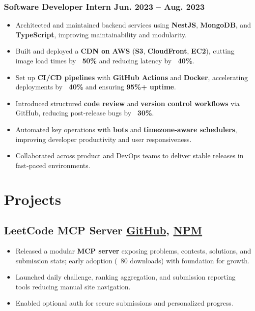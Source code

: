 \documentclass[letterpaper,11pt]{article}
\newcommand{\rside}[1]{
  \hfill {\small\color{accent} #1}%
}
\begin{document}
\subsubsection{Software Developer Intern \rside{Jun. 2023 -- Aug. 2023}}
\begin{itemize}
  \item Architected and maintained backend services using \textbf{NestJS}, \textbf{MongoDB}, and \textbf{TypeScript}, improving maintainability and modularity.
  \item Built and deployed a \textbf{CDN on AWS} (\textbf{S3}, \textbf{CloudFront}, \textbf{EC2}), cutting image load times by \textbf{~50\%} and reducing latency by \textbf{~40\%}.
  \item Set up \textbf{CI/CD pipelines} with \textbf{GitHub Actions} and \textbf{Docker}, accelerating deployments by \textbf{~40\%} and ensuring \textbf{95\%+ uptime}.
  \item Introduced structured \textbf{code review} and \textbf{version control workflows} via GitHub, reducing post-release bugs by \textbf{~30\%}.
  \item Automated key operations with \textbf{bots} and \textbf{timezone-aware schedulers}, improving developer productivity and user responsiveness.
  \item Collaborated across product and DevOps teams to deliver stable releases in fast-paced environments.
\end{itemize}

\section{Projects}

\subsection{LeetCode MCP Server \rside{\href{https://github.com/ayushjaipuriyar/leetcode-mcpserver}{GitHub}, \href{https://www.npmjs.com/package/leetcode-mcpserver}{NPM}}}
\begin{itemize}
  \item Released a modular \textbf{MCP server} exposing problems, contests, solutions, and submission stats; early adoption (~80 downloads) with foundation for growth.
  \item Launched daily challenge, ranking aggregation, and submission reporting tools reducing manual site navigation.
  \item Enabled optional auth for secure submissions and personalized progress.
\end{itemize}
\end{document}
